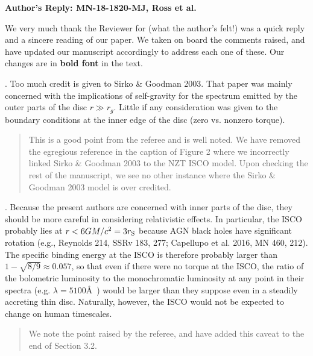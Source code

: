 \documentclass[11pt, a4paper]{article}
\begin{document}
\begin{center}
{\bf Author's Reply: MN-18-1820-MJ, Ross et al.}
\end{center}
\hspace{16pt}

\noindent
We very much thank the Reviewer for (what the author's felt!) was a
quick reply and a sincere reading of our paper. We taken on board the
comments raised, and have updated our manuscript accordingly to
address each one of these. Our changes are in {\bf bold font} in the
text.

\medskip
\medskip
{}. Too much credit is given to Sirko \& Goodman 2003. That paper was
mainly concerned with the implications of self-gravity for the
spectrum emitted by the outer parts of the disc $r \gg r_{g}$. Little
if any consideration was given to the boundary conditions at the inner
edge of the disc (zero vs. nonzero torque). 

\begin{quote}
This is a good point from the referee and is well noted. We have 
removed the egregious reference in the caption of Figure 2 where 
we incorrectly linked Sirko \& Goodman 2003 to the NZT ISCO model. 
Upon checking the rest of the manuscript, we see no other instance 
where the Sirko \& Goodman 2003 model is over credited. 
\end{quote}


. Because the present authors are concerned with inner parts of the
disc, they should be more careful in considering relativistic
effects. In particular, the ISCO probably lies at $r < 6GM/c^{2} =
3r_{\rm S}$ because AGN black holes have significant rotation (e.g.,
Reynolds 214, SSRv 183, 277; Capellupo et al. 2016, MN 460, 212). The
specific binding energy at the ISCO is therefore probably larger than
$1 - \sqrt{8/9} \approx 0.057$, so that even if there were no torque
at the ISCO, the ratio of the bolometric luminosity to the
monochromatic luminosity at any point in their spectra (e.g. $\lambda
= 5100$\AA\ ) would be larger than they suppose even in a steadily
accreting thin disc. Naturally, however, the ISCO would not be
expected to change on human timescales.

\begin{quote}
We note the point raised by the referee, and have added this caveat to 
the end of Section 3.2. 
\end{quote}
\end{document}
